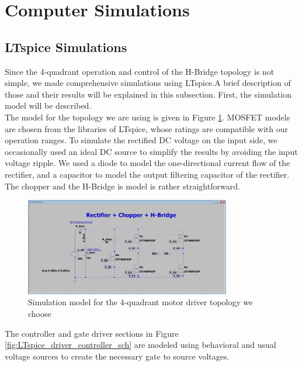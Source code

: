 \section{Computer Simulations} \label{simulations}

\subsection{LTspice Simulations}
Since the 4-quadrant operation and control of the H-Bridge topology is not simple, we made comprehensive simulations using LTspice.A brief description of those and their results will be explained in this subsection. First, the simulation model will be described. \\

The model for the topology we are using is given in Figure \ref{fig:LTspice_topology_sch}. MOSFET models are chosen from the libraries of LTspice, whose ratings are compatible with our operation ranges. To simulate the rectified DC voltage on the input side, we occasionally used an ideal DC source to simplify the results by avoiding the input voltage ripple. We used a diode to model the one-directional current flow of the rectifier, and a capacitor to model the output filtering capacitor of the rectifier. The chopper and the H-Bridge is model is rather straightforward.

\begin{figure}[H]
    \centering
    \includegraphics[width=0.8\textwidth]{Figures/Spice_Figures/Schematics/Rectifier_Chopper_H-Bridge_Schematic.PNG}
    \caption{Simulation model for the 4-quadrant motor driver topology we choose}
    \label{fig:LTspice_topology_sch}
\end{figure}

The controller and gate driver sections in Figure \ref{fig:LTspice_driver_controller_sch} are modeled using behavioral and usual voltage sources to create the necessary gate to source voltages.


